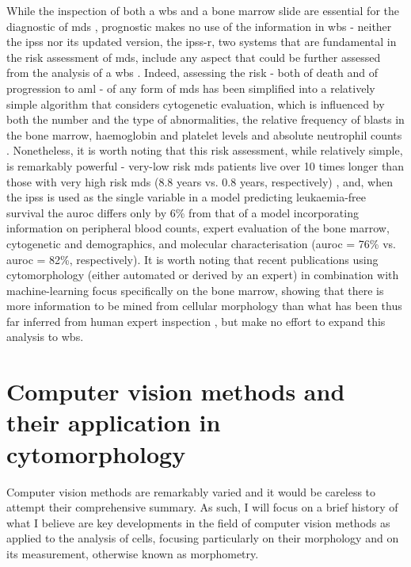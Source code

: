 While the inspection of both a \ac{wbs} and a bone marrow slide are essential for the diagnostic of \ac{mds} \cite{Greenberg2012-en,Arber2016-os}, prognostic makes no use of the information in \ac{wbs} - neither the \ac{ipss} nor its updated version, the \ac{ipss-r}, two systems that are fundamental in the risk assessment of \ac{mds}, include any aspect that could be further assessed from the analysis of a \ac{wbs} \cite{Greenberg2012-en}. Indeed, assessing the risk - both of death and of progression to \ac{aml} - of any form of \ac{mds} has been simplified into a relatively simple algorithm that considers cytogenetic evaluation, which is influenced by both the number and the type of abnormalities, the relative frequency of blasts in the bone marrow, haemoglobin and platelet levels and absolute neutrophil counts \cite{Greenberg2012-en}. Nonetheless, it is worth noting that this risk assessment, while relatively simple, is remarkably powerful - very-low risk \ac{mds} patients live over 10 times longer than those with very high risk \ac{mds} (8.8 years vs. 0.8 years, respectively) \cite{Greenberg2012-en}, and, when the \ac{ipss} is used as the single variable in a model predicting leukaemia-free survival the \ac{auroc} differs only by 6\% from that of a model incorporating information on peripheral blood counts, expert evaluation of the bone marrow, cytogenetic and demographics, and molecular characterisation (\ac{auroc} = 76\% vs. \ac{auroc} = 82\%, respectively). It is worth noting that recent publications using cytomorphology (either automated or derived by an expert) in combination with machine-learning focus specifically on the bone marrow, showing that there is more information to be mined from cellular morphology than what has been thus far inferred from human expert inspection \cite{Bruck2021-fx,Nagata2020-lh}, but make no effort to expand this analysis to \ac{wbs}. 

\section{Computer vision methods and their application in cytomorphology}

Computer vision methods are remarkably varied and it would be careless to attempt their comprehensive summary. As such, I will focus on a brief history of what I believe are key developments in the field of computer vision methods as applied to the analysis of cells, focusing particularly on their morphology and on its measurement, otherwise known as morphometry.

